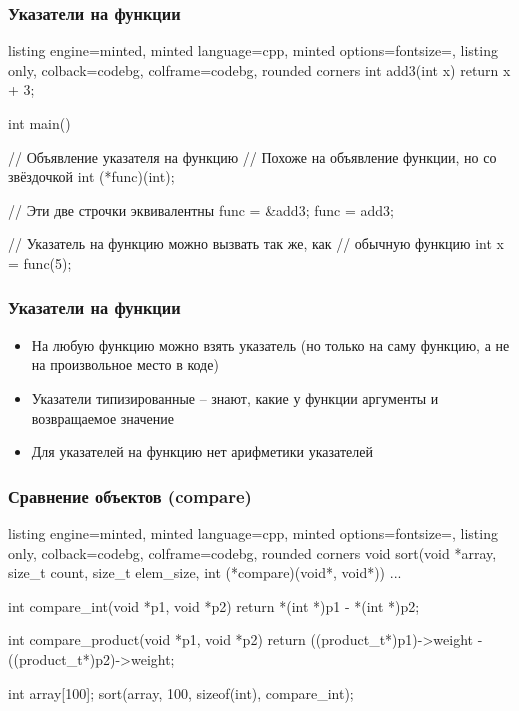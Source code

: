 \documentclass[10pt]{beamer}
\begin{document}
\begin{frame}[fragile]
\frametitle{Указатели на функции}
\begin{tcblisting}{listing engine=minted, minted language=cpp, minted options={fontsize=\scriptsize}, listing only, colback=codebg, colframe=codebg, rounded corners}
int add3(int x) {
  return x + 3;
}

int main() {
  // Объявление указателя на функцию
  // Похоже на объявление функции, но со звёздочкой
  int (*func)(int);

  // Эти две строчки эквивалентны
  func = &add3;
  func = add3;

  // Указатель на функцию можно вызвать так же, как
  // обычную функцию
  int x = func(5);
}
\end{tcblisting}
\end{frame}

\begin{frame}[fragile]
\frametitle{Указатели на функции}
\begin{itemize}
\item На любую функцию можно взять указатель (но только на саму функцию, а не на произвольное место в коде)
\pause
\item Указатели типизированные -- знают, какие у функции аргументы и возвращаемое значение
\pause
\item Для указателей на функцию нет арифметики указателей
\end{itemize}
\end{frame}

\begin{frame}[fragile]
\frametitle{Сравнение объектов (compare)}
\begin{tcblisting}{listing engine=minted, minted language=cpp, minted options={fontsize=\scriptsize}, listing only, colback=codebg, colframe=codebg, rounded corners}
void sort(void *array, size_t count, size_t elem_size,
  int (*compare)(void*, void*)) {
  ...
}

int compare_int(void *p1, void *p2) {
  return *(int *)p1 - *(int *)p2;
}

int compare_product(void *p1, void *p2) {
  return ((product_t*)p1)->weight - ((product_t*)p2)->weight;
}


int array[100];
sort(array, 100, sizeof(int), compare_int);
\end{tcblisting}
\end{frame}
\end{document}
